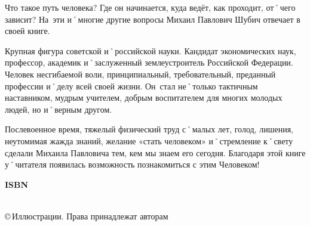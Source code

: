 \begin{titlepage}
	\vfill
	\noindent
	\hspace{1em}\hphantom{\AuthorMark}
	\begin{minipage}[t]{\linewidth-1em-\widthof{\AuthorMark}}
		\footnotesize\hspace{1.5em}	Что такое путь человека? Где он начинается, куда ведёт, как проходит, от˚чего зависит? На~эти и˚многие другие вопросы Михаил Павлович Шубич отвечает в своей книге.

\hspace{1.5em}Крупная фигура советской и˚российской науки. Кандидат экономических наук, профессор, академик и˚заслуженный землеустроитель Российской Федерации. Человек несгибаемой воли, принципиальный, требовательный, преданный профессии и˚делу всей своей жизни. Он~стал не˚только тактичным наставником, мудрым учителем, добрым воспитателем для многих молодых людей, но и˚верным другом.

\hspace{1.5em}Послевоенное время, тяжелый физический труд с˚малых лет, голод, лишения, неутомимая жажда знаний, желание «стать человеком» и˚стремление к˚свету сделали Михаила Павловича тем, кем мы знаем его сегодня. Благодаря этой книге у˚читателя появилась возможность познакомиться с этим Человеком!
	\end{minipage}
		
	\noindent	
	\begin{flushright}
		\bibInd{\UDK}{\BBK}{}	
	\end{flushright}
	
	\vfill
	\noindent
	\parbox[b]{.5\linewidth}{\small\bfseries ISBN \ISBNShortDash}
	\hfill
	\parbox[b]{\widthof{\small©\,Иллюстрации. Права}}
	{\raggedright\small
	 \Copyright\\
	 ©\,Иллюстрации. Права принадлежат авторам	
	}
	
\end{titlepage}